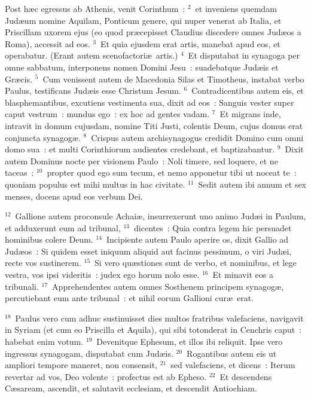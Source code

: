 \lettrine[lines=3,image=true,loversize=0.05,lraise=-0.03]{P}{}ost h\ae c egressus ab Athenis, venit Corinthum~:
${}^{2}$~et inveniens quemdam Jud\ae um nomine Aquilam, Ponticum genere, qui nuper venerat ab Italia, et Priscillam uxorem ejus (eo quod pr\ae cepisset Claudius discedere omnes Jud\ae os a Roma), accessit ad eos.
${}^{3}$~Et quia ejusdem erat artis, manebat apud eos, et operabatur. (Erant autem scenofactori\ae\ artis.)
${}^{4}$~Et disputabat in synagoga per omne sabbatum, interponens nomen Domini Jesu~: suadebatque Jud\ae is et Gr\ae cis.
${}^{5}$~Cum venissent autem de Macedonia Silas et Timotheus, instabat verbo Paulus, testificans Jud\ae is esse Christum Jesum.
${}^{6}$~Contradicentibus autem eis, et blasphemantibus, excutiens vestimenta sua, dixit ad eos~: Sanguis vester super caput vestrum~: mundus ego~: ex hoc ad gentes vadam.
${}^{7}$~Et migrans inde, intravit in domum cujusdam, nomine Titi Justi, colentis Deum, cujus domus erat conjuncta synagog\ae .
${}^{8}$~Crispus autem archisynagogus credidit Domino cum omni domo sua~: et multi Corinthiorum audientes credebant, et baptizabantur.
${}^{9}$~Dixit autem Dominus nocte per visionem Paulo~: Noli timere, sed loquere, et ne taceas~:
${}^{10}$~propter quod ego sum tecum, et nemo apponetur tibi ut noceat te~: quoniam populus est mihi multus in hac civitate.
${}^{11}$~Sedit autem ibi annum et sex menses, docens apud eos verbum Dei.


${}^{12}$~Gallione autem proconsule Achai\ae , insurrexerunt uno animo Jud\ae i in Paulum, et adduxerunt eum ad tribunal,
${}^{13}$~dicentes~: Quia contra legem hic persuadet hominibus colere Deum.
${}^{14}$~Incipiente autem Paulo aperire os, dixit Gallio ad Jud\ae os~: Si quidem esset iniquum aliquid aut facinus pessimum, o viri Jud\ae i, recte vos sustinerem.
${}^{15}$~Si vero qu\ae stiones sunt de verbo, et nominibus, et lege vestra, vos ipsi videritis~: judex ego horum nolo esse.
${}^{16}$~Et minavit eos a tribunali.
${}^{17}$~Apprehendentes autem omnes Sosthenem principem synagog\ae , percutiebant eum ante tribunal~: et nihil eorum Gallioni cur\ae\ erat.


${}^{18}$~Paulus vero cum adhuc sustinuisset dies multos fratribus valefaciens, navigavit in Syriam (et cum eo Priscilla et Aquila), qui sibi totonderat in Cenchris caput~: habebat enim votum.
${}^{19}$~Devenitque Ephesum, et illos ibi reliquit. Ipse vero ingressus synagogam, disputabat cum Jud\ae is.
${}^{20}$~Rogantibus autem eis ut ampliori tempore maneret, non consensit,
${}^{21}$~sed valefaciens, et dicens~: Iterum revertar ad vos, Deo volente~: profectus est ab Epheso.
${}^{22}$~Et descendens C\ae saream, ascendit, et salutavit ecclesiam, et descendit Antiochiam.


